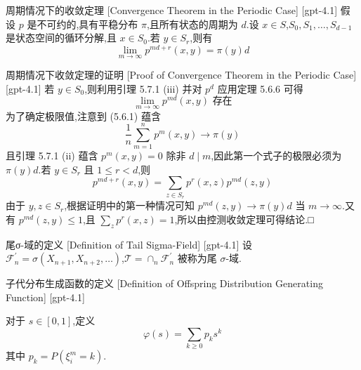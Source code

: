 \documentclass[UTF8]{ctexart}
\begin{document}
    
    
    \begin{thm}
        {周期情况下的收敛定理}
        [Convergence Theorem in the Periodic Case]
        [gpt-4.1]
        假设 $p$ 是不可约的,具有平稳分布 $\pi$,且所有状态的周期为 $d$.设 $x \in S$,$S_{0}, S_{1}, \ldots, S_{d-1}$ 是状态空间的循环分解,且 $x \in S_{0}$.若 $y \in S_{r}$,则有
\[
\lim_{m \to \infty} p^{md + r}(x, y) = \pi(y) d
\]

    \end{thm}
    
    
    
    \begin{prf}
        {周期情况下收敛定理的证明}
        [Proof of Convergence Theorem in the Periodic Case]
        [gpt-4.1]
        若 $y \in S_{0}$,则利用引理 5.7.1 (iii) 并对 $p^{d}$ 应用定理 5.6.6 可得
\[
\lim_{m \to \infty} p^{md}(x, y) \text{ 存在}
\]
为了确定极限值,注意到 (5.6.1) 蕴含
\[
\frac{1}{n} \sum_{m=1}^{n} p^{m}(x, y) \to \pi(y)
\]
且引理 5.7.1 (ii) 蕴含 $p^{m}(x, y) = 0$ 除非 $d \mid m$,因此第一个式子的极限必须为 $\pi(y) d$.若 $y \in S_{r}$ 且 $1 \leq r < d$,则
\[
p^{md + r}(x, y) = \sum_{z \in S_{r}} p^{r}(x, z) p^{md}(z, y)
\]
由于 $y, z \in S_{r}$,根据证明中的第一种情况可知 $p^{md}(z, y) \to \pi(y) d$ 当 $m \to \infty$.又有 $p^{md}(z, y) \leq 1$,且 $\sum_{z} p^{r}(x, z) = 1$,所以由控测收敛定理可得结论.□

    \end{prf}
    
    
    
    \begin{dfn}
        {尾σ-域的定义}
        [Definition of Tail Sigma-Field]
        [gpt-4.1]
        设 $\mathcal{F}_{n}^{\prime} = \sigma(X_{n+1}, X_{n+2}, \ldots)$,$\mathcal{T} = \cap_{n} \mathcal{F}_{n}^{\prime}$ 被称为尾 $\sigma$-域.

    \end{dfn}
    
    
    
    \begin{dfn}
        {子代分布生成函数的定义}
        [Definition of Offspring Distribution Generating Function]
        [gpt-4.1]
        
对于 $s \in [0, 1]$,定义
\[
\varphi ( s ) = \sum_{k \geq 0} p_k s^k
\]
其中 $p_k = P(\xi_i^m = k)$.

    \end{dfn}
    
\end{document}
